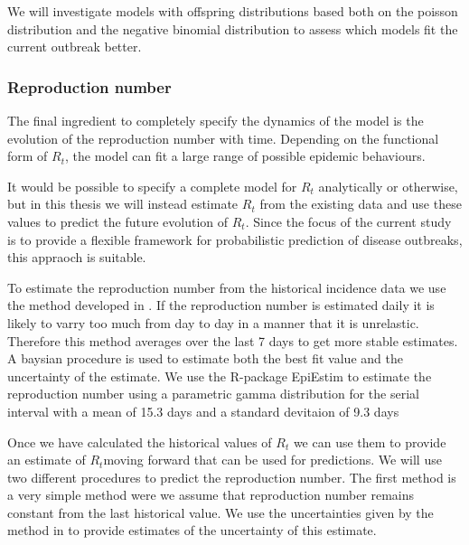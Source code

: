 \documentclass[12pt]{article}
\begin{document}
We will investigate models with offspring distributions based both on the poisson distribution and the negative binomial distribution to assess which models fit the current outbreak better.

\subsubsection{Reproduction number}
The final ingredient to completely specify the dynamics of the model is the evolution of the reproduction number with time. Depending on the functional form of $R_t$, the model can fit a large range of possible epidemic behaviours. %

It would be possible to specify a complete model for $R_t$ analytically or otherwise, but in this thesis we will instead estimate $R_t$ from the existing data and use these values to predict the future evolution of $R_t$. Since the focus of the current study is to provide a flexible framework for probabilistic prediction of disease outbreaks, this appraoch is suitable.

To estimate the reproduction number from the historical incidence data we use the method developed in \cite{coriNewFrameworkSoftware2013}. If the reproduction number is estimated daily it is likely to varry too much from day to day in a manner that it is unrelastic. Therefore this method averages over the last 7 days to get more stable estimates. A baysian procedure is used to estimate both the best fit value and the uncertainty of the estimate. We use the R-package EpiEstim \cite{coriEpiEstimEpiEstimPackage2013} to estimate the reproduction number using a parametric gamma distribution for the serial interval with a mean of 15.3 days and a standard devitaion of 9.3 days \cite{EbolaVirusDisease2014}

Once we have calculated the historical values of $R_t$ we can use them to provide an estimate of $R_t$moving forward that can be used for predictions. We will use two different procedures to predict the reproduction number. The first method is a very simple method were we assume that reproduction number remains constant from the last historical value. We use the uncertainties given by the method in \cite{coriNewFrameworkSoftware2013} to provide estimates of the uncertainty of this estimate.
\end{document}
